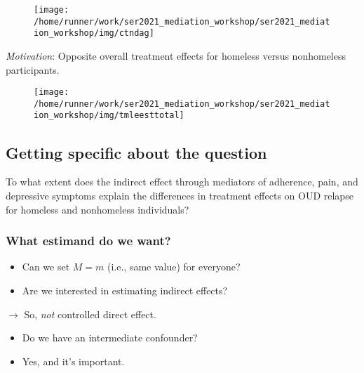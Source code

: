 \documentclass[
  12pt,
]{book}
\providecommand{\tightlist}{%
  \setlength{\itemsep}{0pt}\setlength{\parskip}{0pt}}
\theoremstyle{definition}
\theoremstyle{definition}
\theoremstyle{definition}
\newcommand{\1}{\mathbbm{1}}
\begin{document}
\begin{figure}

{\centering \texttt{[image: /home/runner/work/ser2021\_mediation\_workshop/ser2021\_mediation\_workshop/img/ctndag]} 

}

\end{figure}

\emph{Motivation}: Opposite overall treatment effects for homeless versus
nonhomeless participants.

\begin{figure}

{\centering \texttt{[image: /home/runner/work/ser2021\_mediation\_workshop/ser2021\_mediation\_workshop/img/tmleesttotal]} 

}

\end{figure}

\hypertarget{getting-specific-about-the-question}{%
\subsection{Getting specific about the question}\label{getting-specific-about-the-question}}

To what extent does the indirect effect through mediators of adherence, pain, and
depressive symptoms explain the differences in treatment effects on OUD relapse
for homeless and nonhomeless individuals?

\hypertarget{what-estimand-do-we-want}{%
\subsubsection*{What estimand do we want?}\label{what-estimand-do-we-want}}


\begin{itemize}
\tightlist
\item
  Can we set \(M=m\) (i.e., same value) for everyone?
\item
  Are we interested in estimating indirect effects?
\end{itemize}

\(\rightarrow\) So, \emph{not} controlled direct effect.

\begin{itemize}
\tightlist
\item
  Do we have an intermediate confounder?
\item
  Yes, and it's important.
\end{itemize}
\end{document}

